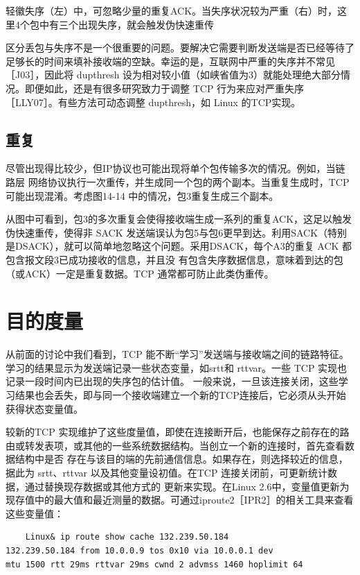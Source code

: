 轻徽失序（左）中，可忽略少量的重复ACK。当失序状况较为严重（右）时，这里4个包中有三个出现失序，就会触发伪快速重传

区分丢包与失序不是一个很重要的问题。要解决它需要判断发送端是否已经等待了足够长的时间来填补接收端的空缺。幸运的是，互联网中严重的失序并不常见［J03］，因此将
dupthresh 设为相对较小值（如峡省值为3）就能处理绝大部分情况。即便如此，还是有很多研究致力于调整 TCP
行为来应对严重失序［LLY07］。有些方法可动态调整 dupthresh，如
Linux 的TCP实现。

\subsection{重复}
尽管出现得比较少，但IP协议也可能出现将单个包传输多次的情况。例如，当链路层
网络协议执行一次重传，并生成同一个包的两个副本。当重复生成时，TCP 可能出现混淆。考虑图14-14 中的情况，包3重复生成三个副本。

从图中可看到，包3的多次重复会使得接收端生成一系列的重复ACK，这足以触发伪快速重传，使得非 SACK
发送端误认为包5与包6更早到达。利用SACK（特别是DSACK），就可以简单地忽略这个问题。采用DSACK，每个A3的重复 ACK
都包含报文段3已成功接收的信息，并且没
有包含失序数据信息，意味着到达的包（或ACK）一定是重复数据。TCP 通常都可防止此类伪重传。

\section{目的度量}
从前面的讨论中我们看到，TCP 能不断“学习”发送端与接收端之间的链路特征。学习的结果显示为发送端记录一些状态变量，如srtt和
rttvar。一些 TCP 实现也记录一段时间内已出现的失序包的估计值。
一般来说，一旦该连接关闭，这些学习结果也会丢失，即与同一个接收端建立一个新的TCP连接后，它必须从头开始获得状态变量值。

较新的TCP 实现维护了这些度量值，即使在连接断开后，也能保存之前存在的路由或转发表项，或其他的一些系统数据结构。当创立一个新的连接时，首先查看数据结构中是否
存在与该目的端的先前通信信息。如果存在，则选择较近的信息，据此为 srtt、rttvar 以及其他变量设初值。在TCP
连接关闭前，可更新统计数据，通过替换现存数据或其他方式的
更新来实现。在Linux 2.6中，变量值更新为现存值中的最大值和最近测量的数据。可通过iproute2［IPR2］的相关工具来查看这些变量值：

\begin{verbatim}
    Linux& ip route show cache 132.239.50.184
132.239.50.184 from 10.0.0.9 tos 0x10 via 10.0.0.1 dev
mtu 1500 rtt 29ms rttvar 29ms cwnd 2 advmss 1460 hoplimit 64
\end{verbatim}

